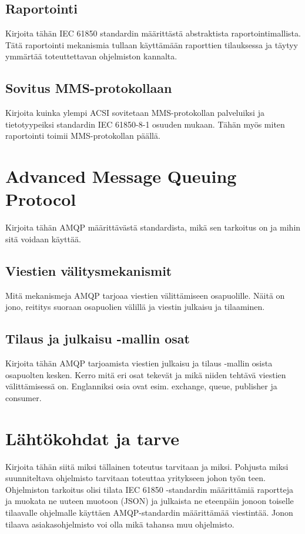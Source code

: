 \documentclass[globalnumbering,centeredcaptions,draftfooter]{tutthesis} %
\begin{document}
\section{Raportointi}
Kirjoita tähän IEC 61850 standardin määrittästä abstraktista raportointimallista. Tätä raportointi mekanismia tullaan käyttämään raporttien tilauksessa ja täytyy ymmärtää toteuttettavan ohjelmiston kannalta.

\section{Sovitus MMS-protokollaan}
Kirjoita kuinka ylempi ACSI sovitetaan MMS-protokollan palveluiksi ja tietotyypeiksi standardin IEC 61850-8-1 osuuden mukaan. Tähän myös miten raportointi toimii MMS-protokollan päällä.


\chapter{Advanced Message Queuing Protocol}
\label{ch:advanced message queuing protocol}
Kirjoita tähän AMQP määrittävästä standardista, mikä sen tarkoitus on ja mihin sitä voidaan käyttää.

\section{Viestien välitysmekanismit}
Mitä mekanismeja AMQP tarjoaa viestien välittämiseen osapuolille. Näitä on jono, reititys suoraan osapuolien välillä ja viestin julkaisu ja tilaaminen.

\section{Tilaus ja julkaisu -mallin osat}
Kirjoita tähän AMQP tarjoamista viestien julkaisu ja tilaus -mallin osista osapuolten kesken. Kerro mitä eri osat tekevät ja mikä niiden tehtävä viestien välittämisessä on. Englanniksi osia ovat esim. exchange, queue, publisher ja consumer.


\chapter{Lähtökohdat ja tarve}
\label{ch:lähtökohdat ja tarve}
Kirjoita tähän siitä miksi tällainen toteutus tarvitaan ja miksi. Pohjusta miksi suunniteltava ohjelmisto tarvitaan toteuttaa yritykseen johon työn teen. Ohjelmiston tarkoitus olisi tilata IEC 61850 -standardin määrittämiä raportteja ja muokata ne uuteen muotoon (JSON) ja julkaista ne eteenpäin jonoon toiselle tilaavalle ohjelmalle käyttäen AMQP-standardin määrittämää viestintää. Jonon tilaava asiakasohjelmisto voi olla mikä tahansa muu ohjelmisto.
\end{document}
